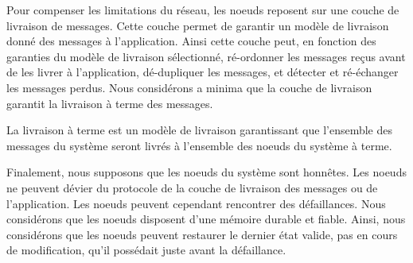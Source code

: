 Pour compenser les limitations du réseau, les noeuds reposent sur une couche de livraison de messages.
Cette couche permet de garantir un modèle de livraison donné des messages à l'application.
Ainsi cette couche peut, en fonction des garanties du modèle de livraison sélectionné, ré-ordonner les messages reçus avant de les livrer à l'application, dé-dupliquer les messages, et détecter et ré-échanger les messages perdus.
Nous considérons a minima que la couche de livraison garantit la livraison à terme des messages.

\begin{definition}
    La livraison à terme est un modèle de livraison garantissant que l'ensemble des messages du système seront livrés à l'ensemble des noeuds du système à terme.
\end{definition}

Finalement, nous supposons que les noeuds du système sont honnêtes.
Les noeuds ne peuvent dévier du protocole de la couche de livraison des messages ou de l'application.
Les noeuds peuvent cependant rencontrer des défaillances.
Nous considérons que les noeuds disposent d'une mémoire durable et fiable.
Ainsi, nous considérons que les noeuds peuvent restaurer le dernier état valide, \ie pas en cours de modification, qu'il possédait juste avant la défaillance.
